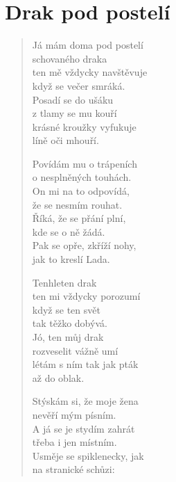 \section{Drak pod postelí}

\thispagestyle{empty}

\begin{multicols}{3}


\begin{verse}
	
Já mám doma pod postelí\\
schovaného draka\\
ten mě vždycky navštěvuje\\
když se večer smráká.\\
Posadí se do ušáku\\
z tlamy se mu kouří\\
krásné kroužky vyfukuje\\
líně oči  mhouří.

Povídám mu o trápeních\\
o nesplněných touhách.\\
On mi na to odpovídá,\\
že se nesmím rouhat.\\
Říká, že se přání plní,\\
kde se o ně žádá.\\
Pak se opře, zkříží nohy,\\
jak to kreslí Lada.

\columnbreak

Tenhleten drak\\
ten mi vždycky porozumí\\
když se ten svět\\
tak těžko dobývá.\\
Jó, ten můj drak\\
rozveselit vážně umí\\
létám s ním tak jak pták\\
až do oblak.

Stýskám si, že moje žena\\
nevěří mým písním.\\
A já se je stydím zahrát\\
třeba i jen místním.\\
Usměje se spiklenecky, jak\\
na stranické schůzi:\\


\end{verse}
\end{multicols}
